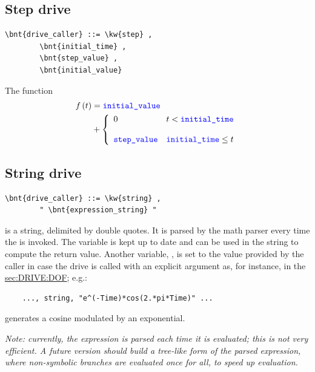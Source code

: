 \subsection{Step drive}
\begin{Verbatim}[commandchars=\\\{\}]
    \bnt{drive_caller} ::= \kw{step} ,
        \bnt{initial_time} , 
        \bnt{step_value} ,
        \bnt{initial_value}
\end{Verbatim}    
The function
\begin{align}
	f\plbr{t} &= \nt{initial\_value} \nonumber \\
	&+ \lcubr{\matr{ll}{
		0 
			& t < \nt{initial\_time} \\
		\\
		\nt{step\_value}
			& \nt{initial\_time} \le t
	}}
\end{align}

\subsection{String drive}
\begin{Verbatim}[commandchars=\\\{\}]
    \bnt{drive_caller} ::= \kw{string} ,
        " \bnt{expression_string} "
\end{Verbatim}
 is a string, delimited by double quotes.
It is parsed by the math parser every time 
the  is invoked.
The variable  is kept up to date and can be used in the 
string to compute the return value.
Another variable, , is set to the value provided by the caller
in case the drive is called with an explicit argument as, for instance,
in the \hyperref{\kw{dof drive}}{\kw{dof drive} (see Section~}{)}{sec:DRIVE:DOF};
e.g.:
\begin{verbatim}
    ..., string, "e^(-Time)*cos(2.*pi*Time)" ...
\end{verbatim}
generates a cosine modulated by an exponential.

\emph{Note: currently, the expression is parsed each time it is evaluated;
this is not very efficient.
A future version should build a tree-like form of the
parsed expression, where non-symbolic branches are evaluated once for all,
to speed up evaluation.}

